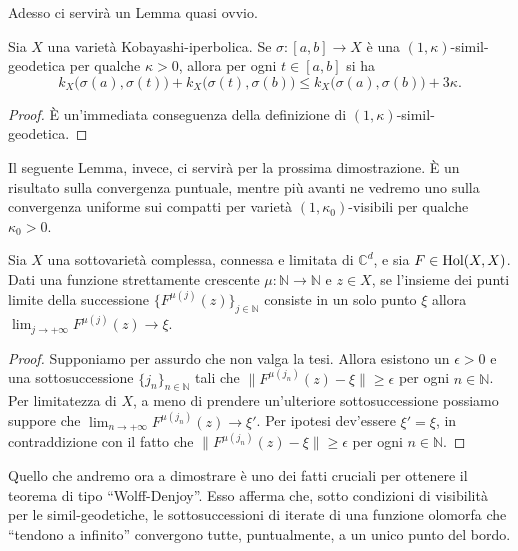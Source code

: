 Adesso ci servirà un Lemma quasi ovvio.

\begin{lm} \label{quasiovvio}
    Sia $X$ una varietà Kobayashi-iperbolica. Se $\sigma:[a,b] \longrightarrow X$ è una $(1,\kappa)$-simil-geodetica per qualche $\kappa>0$, allora per ogni $t \in [a,b]$ si ha
    $$k_X\big(\sigma(a),\sigma(t)\big)+k_X\big(\sigma(t),\sigma(b)\big) \le k_X\big(\sigma(a),\sigma(b)\big)+3\kappa.$$
\end{lm}

\begin{proof}
    È un'immediata conseguenza della definizione di $(1,\kappa)$-simil-geodetica.
\end{proof}

Il seguente Lemma, invece, ci servirà per la prossima dimostrazione. È un risultato sulla convergenza puntuale, mentre più avanti ne vedremo uno sulla convergenza uniforme sui compatti per varietà $(1,\kappa_0)$-visibili per qualche $\kappa_0>0$.

\begin{lm} \label{lemmasottosotto1}
    Sia $X$ una sottovarietà complessa, connessa e limitata di $\mathbb{C}^d$, e sia $F\in\textnormal{Hol}(X,X)$. Dati una funzione strettamente crescente $\mu:\mathbb{N}\longrightarrow\mathbb{N}$ e $z\in X$, se l'insieme dei punti limite della successione $\{F^{\mu(j)}(z)\}_{j\in\mathbb{N}}$ consiste in un solo punto $\xi$ allora $\displaystyle\lim_{j\longrightarrow+\infty}F^{\mu(j)}(z)\longrightarrow\xi$.
\end{lm}

\begin{proof}
    Supponiamo per assurdo che non valga la tesi. Allora esistono un $\epsilon>0$ e una sottosuccessione $\{j_n\}_{n\in\mathbb{N}}$ tali che $\|F^{\mu(j_n)}(z)-\xi\| \ge \epsilon$ per ogni $n\in\mathbb{N}$. Per limitatezza di $X$, a meno di prendere un'ulteriore sottosuccessione possiamo suppore che $\displaystyle\lim_{n\longrightarrow+\infty}F^{\mu(j_n)}(z)\longrightarrow\xi'$. Per ipotesi dev'essere $\xi'=\xi$, in contraddizione con il fatto che $\|F^{\mu(j_n)}(z)-\xi\| \ge \epsilon$ per ogni $n\in\mathbb{N}$.
\end{proof}

Quello che andremo ora a dimostrare è uno dei fatti cruciali per ottenere il teorema di tipo ``Wolff-Denjoy''. Esso afferma che, sotto condizioni di visibilità per le simil-geodetiche, le sottosuccessioni di iterate di una funzione olomorfa che ``tendono a infinito'' convergono tutte, puntualmente, a un unico punto del bordo.

